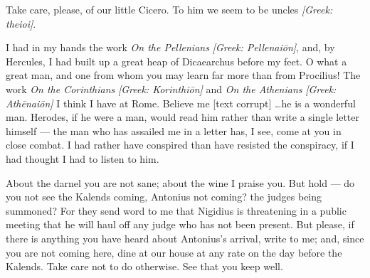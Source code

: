 

 Take care, please, of our little Cicero. To him we seem to be uncles \textit{[Greek: theioi]}.

 I had in my hands the work \textit{On the Pellenians} \textit{[Greek: Pellenai\=on]}, and, by Hercules, I had built up a great heap of Dicaearchus before my feet. O what a great man, and one from whom you may learn far more than from Procilius! The work \textit{On the Corinthians} \textit{[Greek: Korinthi\=on]} and \textit{On the Athenians} \textit{[Greek: Ath\=enai\=on]} I think I have at Rome. Believe me [text corrupt] \ldots he is a wonderful man. Herodes, if he were a man, would read him rather than write a single letter himself --- the man who has assailed me in a letter has, I see, come at you in close combat. I had rather have conspired than have resisted the conspiracy, if I had thought I had to listen to him.

 About the darnel you are not sane; about the wine I praise you. But hold --- do you not see the Kalends coming, Antonius not coming? the judges being summoned? For they send word to me that Nigidius is threatening in a public meeting that he will haul off any judge who has not been present. But please, if there is anything you have heard about Antonius's arrival, write to me; and, since you are not coming here, dine at our house at any rate on the day before the Kalends. Take care not to do otherwise. See that you keep well.
